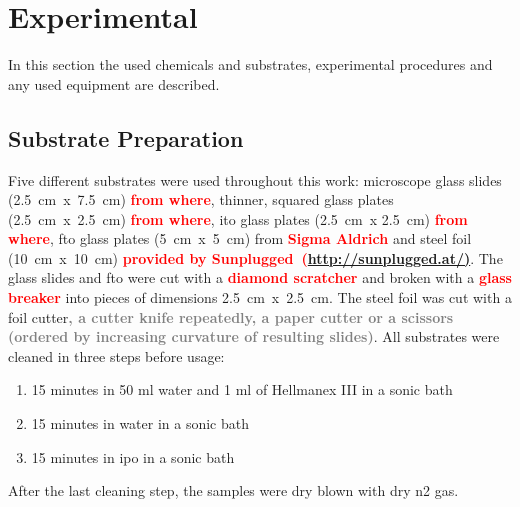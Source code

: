 \documentclass[a4paper]{article}
\newcommand{\td}[1]{\textbf{\textcolor{red}{#1}}}
\newcommand{\me}[1]{\textbf{\textcolor{gray}{#1}}}
\begin{document}
\section{Experimental}
\label{sec:exp}
In this section the used chemicals and substrates, experimental procedures and any used equipment are described. 
\subsection{Substrate Preparation}
Five different substrates were used throughout this work: 
microscope glass slides (2.5~cm~x~7.5~cm) \td{from where}, thinner, squared glass plates (2.5~cm~x~2.5~cm) \td{from where}, \gls{ito} glass plates (2.5~cm~x 2.5~cm) \td{from where}, \gls{fto} glass plates (5~cm~x~5~cm) from \td{Sigma Aldrich} and steel foil (10~cm~x~10~cm) \td{provided by Sunplugged~(\url{http://sunplugged.at/)}}.
The glass slides and \gls{fto} were cut with a \td{diamond scratcher} and broken with a \td{glass breaker} into pieces of dimensions 2.5~cm~x~2.5~cm.
The steel foil was cut with a foil cutter\me{, a cutter knife repeatedly, a paper cutter or a scissors (ordered by increasing curvature of resulting slides)}.
All substrates were cleaned in three steps before usage:
\begin{enumerate}
	\item 15 minutes in 50 ml \gls{water} and 1 ml of Hellmanex III in a sonic bath
	\item 15 minutes in \gls{water} in a sonic bath
	\item 15 minutes in \gls{ipo} in a sonic bath 
\end{enumerate}
After the last cleaning step, the samples were dry blown with dry \gls{n2} gas. 

\iffalse
\subsection{Cutting of the steel foil}
\label{sec:cut}
There is a red foil cutter in the vacuum room, which cuts the foil without much bending.
Alternatively, the foil can be cut without bending by cutting repeatedly with a cutter knife.
The foil is cut into 2.5 x 2.7 mm plates.
The small plates are marked with an diamond cutter pen.
The plates are cleaned with 1ml of Hellmanex III in 50-100 ml \gls{water} in the sonic bath for 15 min, then in \gls{water} for 15 min and finally in \gls{ipo} for 15 min. 
The samples are dry blown with dry N$_2$ and stored until doctor blading.
\fi
\end{document}
